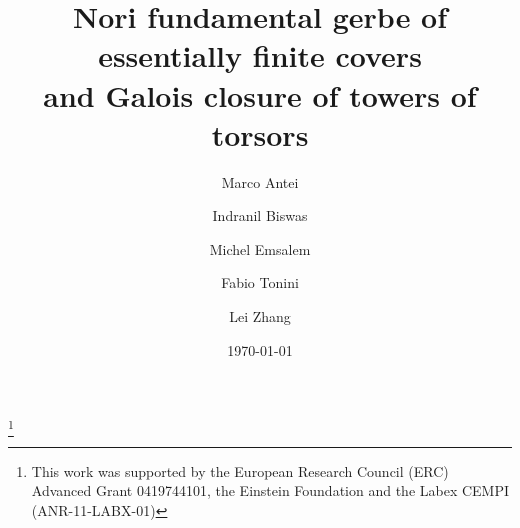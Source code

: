 \documentclass[12pt,reqno]{amsart}
\theoremstyle{plain}
\theoremstyle{definition}
\numberwithin{thm}{section}
\newcounter{x}\setcounter{x}{1}
\theoremstyle{plain}
\begin{document}
\title[Essentially finite covers and towers of torsors]{Nori fundamental gerbe of 
essentially finite covers \\ and Galois closure of towers of torsors}

\author[M. Antei]{Marco Antei}

\address{
Laboratoire J.A.Dieudonn\'e, UMR CNRS-UNS No 7351 \\
Universit\'e de Nice Sophia-Antipolis, Parc Valrose \\
06108 NICE Cedex 2, France }

\author[I. Biswas]{Indranil Biswas} 

\address{
    School of Mathematics, Tata Institute of Fundamental
Research, Homi Bhabha Road, Bombay 400005, India }

\author[M. Emsalem]{Michel Emsalem}

\address{
    Laboratoire Paul Painlev\'e, U.F.R. de Math\'ematiques, Universit\'e des 
Sciences et des Technologies de Lille 1, 59 655 Villeneuve d'Ascq, France }

\author[F. Tonini]{Fabio Tonini} 

\address{
    Freie Universit\"at Berlin\\
    FB Mathematik und Informatik\\
    Arnimallee 3\\ Zimmer 112A\\
    14195 Berlin\\ Deutschland }

\author[L. Zhang]{Lei Zhang}

 \address{
    Freie Universit\"at Berlin\\
    FB Mathematik und Informatik\\
    Arnimallee 3\\ Zimmer 112A\\
    14195 Berlin\\ Deutschland }
 

\thanks{This work was supported by the European Research Council (ERC) Advanced Grant 0419744101, the Einstein Foundation and the Labex CEMPI 
(ANR-11-LABX-01)}
\date{\today}


\end{document}
